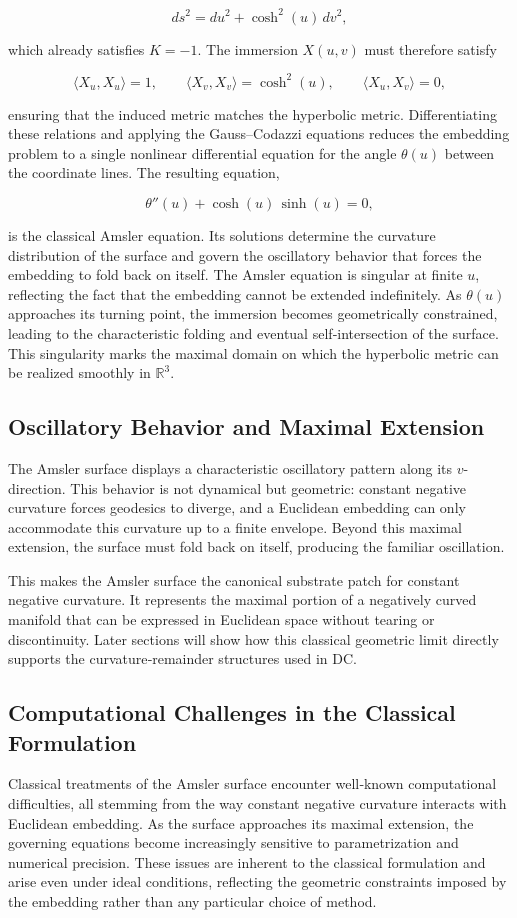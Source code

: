 \documentclass[final,onefignum,onetabnum]{siamart}
\begin{document}
\[
ds^2 = du^2 + \cosh^2(u)\,dv^2,
\]


which already satisfies $K = -1$. The immersion $X(u,v)$ must therefore satisfy


\[
\langle X_u, X_u \rangle = 1, \qquad
\langle X_v, X_v \rangle = \cosh^2(u), \qquad
\langle X_u, X_v \rangle = 0,
\]


ensuring that the induced metric matches the hyperbolic metric.
Differentiating these relations and applying the Gauss–Codazzi equations reduces the embedding problem to a single nonlinear differential equation for the angle $\theta(u)$ between the coordinate lines. The resulting equation,


\[
\theta''(u) + \cosh(u)\,\sinh(u) = 0,
\]


is the classical Amsler equation. Its solutions determine the curvature distribution of the surface and govern the oscillatory behavior that forces the embedding to fold back on itself. The Amsler equation is singular at finite $u$, reflecting the fact that the embedding cannot be extended indefinitely. As $\theta(u)$ approaches its turning point, the immersion becomes geometrically constrained, leading to the characteristic folding and eventual self‑intersection of the surface. This singularity marks the maximal domain on which the hyperbolic metric can be realized smoothly in $\mathbb{R}^3$.


\subsection{Oscillatory Behavior and Maximal Extension}
The Amsler surface displays a characteristic oscillatory pattern along its $v$-direction. This behavior is not dynamical but geometric: constant negative curvature forces geodesics to diverge, and a Euclidean embedding can only accommodate this curvature up to a finite envelope. Beyond this maximal extension, the surface must fold back on itself, producing the familiar oscillation.

This makes the Amsler surface the canonical substrate patch for constant negative curvature. It represents the maximal portion of a negatively curved manifold that can be expressed in Euclidean space without tearing or discontinuity. Later sections will show how this classical geometric limit directly supports the curvature‑remainder structures used in DC.

\subsection{Computational Challenges in the Classical Formulation}
Classical treatments of the Amsler surface encounter well‑known computational difficulties, all stemming from the way constant negative curvature interacts with Euclidean embedding. As the surface approaches its maximal extension, the governing equations become increasingly sensitive to parametrization and numerical precision. These issues are inherent to the classical formulation and arise even under ideal conditions, reflecting the geometric constraints imposed by the embedding rather than any particular choice of method.
\end{document}
